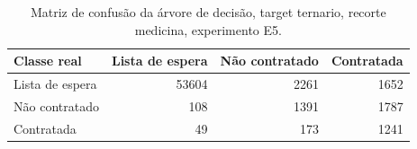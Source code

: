 \begin{table}
\caption{Matriz de confusão da árvore de decisão, target ternario, recorte medicina, experimento E5.}
\label{tab:matriz_confusao_treeClassification_ternario_recorte_medicina_holdout_80_20_e5}
\begin{tabular}{lrrr}
\toprule
Classe real & Lista de espera & Não contratado & Contratada \\
\midrule
Lista de espera & 53604 & 2261 & 1652 \\
Não contratado & 108 & 1391 & 1787 \\
Contratada & 49 & 173 & 1241 \\
\bottomrule
\end{tabular}
\end{table}
